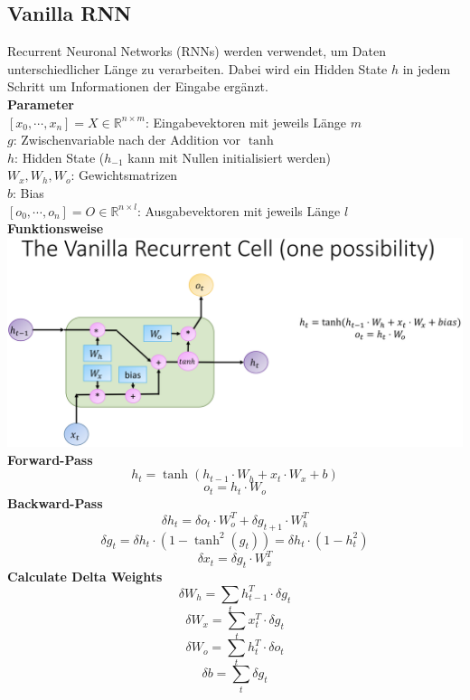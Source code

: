 \documentclass[12pt]{article}
\newcommand{\R}{\mathbb{R}}
\begin{document}
	\subsection{Vanilla RNN}
	Recurrent Neuronal Networks (RNNs) werden verwendet, um Daten unterschiedlicher Länge zu verarbeiten. Dabei wird ein Hidden State $h$ in jedem Schritt um Informationen der Eingabe ergänzt.\\
	\textbf{Parameter}\\
	$[x_0, \cdots, x_n] = X \in \R^{n \times m}$: Eingabevektoren mit jeweils Länge $m$\\
	$g$: Zwischenvariable nach der Addition vor $\tanh$\\
	$h$: Hidden State ($h_{-1}$ kann mit Nullen initialisiert werden)\\
	$W_x, W_h, W_o$: Gewichtsmatrizen\\
	$b$: Bias\\
	$[o_0, \cdots, o_n] = O \in \R^{n \times l}$: Ausgabevektoren mit jeweils Länge $l$\\
	\textbf{Funktionsweise}\\
	\includegraphics[width=\linewidth]{figures/vanilla-rnn.png}\\
	\textbf{Forward-Pass}
	$$h_t = \tanh(h_{t-1} \cdot W_h + x_t \cdot W_x + b)$$
	$$o_t = h_t \cdot W_o$$
	\textbf{Backward-Pass}
	$$\delta h_t = \delta o_t \cdot W_o^T + \delta g_{t+1} \cdot W_h^T$$
	$$\delta g_t = \delta h_t \cdot (1 - \tanh^2(g_t)) = \delta h_t \cdot (1 - h_t^2)$$
	$$\delta x_t = \delta g_t \cdot W_x^T$$
	\textbf{Calculate Delta Weights}
	$$\delta W_h = \sum_t h_{t-1}^T \cdot \delta g_t$$
	$$\delta W_x = \sum_t x_t^T \cdot \delta g_t$$
	$$\delta W_o = \sum_t h_t^T \cdot \delta o_t$$
	$$\delta b = \sum_t \delta g_t$$
\end{document}
